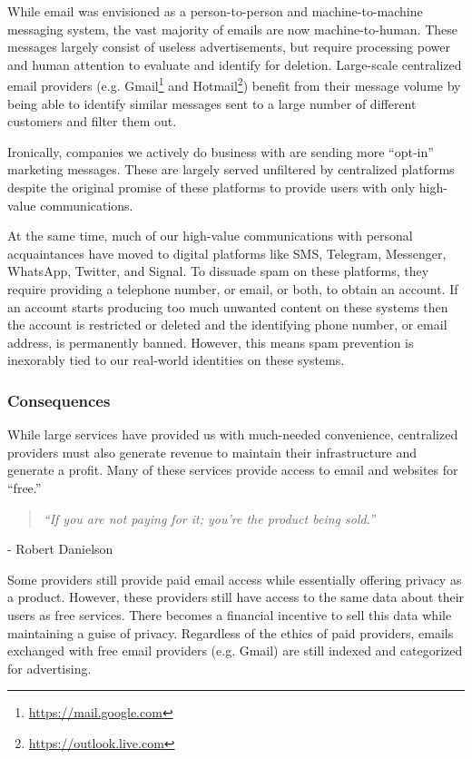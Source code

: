 \documentclass{article}
\newcommand{\chapquote}[2]{\begin{quotation} \textit{#1} \end{quotation} \begin{flushright} - #2\end{flushright} }
\begin{document}
While email was envisioned as a person-to-person and machine-to-machine messaging system, the vast majority of emails are now machine-to-human. These messages largely consist of useless advertisements, but require processing power and human attention to evaluate and identify for deletion. Large-scale centralized email providers (e.g. Gmail\footnote{\url{https://mail.google.com}} and Hotmail\footnote{\url{https://outlook.live.com}}) benefit from their message volume by being able to identify similar messages sent to a large number of different customers and filter them out.

Ironically, companies we actively do business with are sending more ``opt-in'' marketing messages. These are largely served unfiltered by centralized platforms despite the original promise of these platforms to provide users with only high-value communications.

At the same time, much of our high-value communications with personal acquaintances have moved to digital platforms like SMS, Telegram, Messenger, WhatsApp, Twitter, and Signal. To dissuade spam on these platforms, they require providing a telephone number, or email, or both, to obtain an account. If an account starts producing too much unwanted content on these systems then the account is restricted or deleted and the identifying phone number, or email address, is permanently banned. However, this means spam prevention is inexorably tied to our real-world identities on these systems.

\subsubsection{Consequences}

While large services have provided us with much-needed convenience, centralized providers must also generate revenue to maintain their infrastructure and generate a profit. Many of these services provide access to email and websites for ``free.''

\chapquote{\large ``If you are not paying for it; you're the product being sold.''}{Robert Danielson}

Some providers still provide paid email access while essentially offering privacy as a product. However, these providers still have access to the same data about their users as free services. There becomes a financial incentive to sell this data while maintaining a guise of privacy. Regardless of the ethics of paid providers, emails exchanged with free email providers (e.g. Gmail) are still indexed and categorized for advertising.
\end{document}
